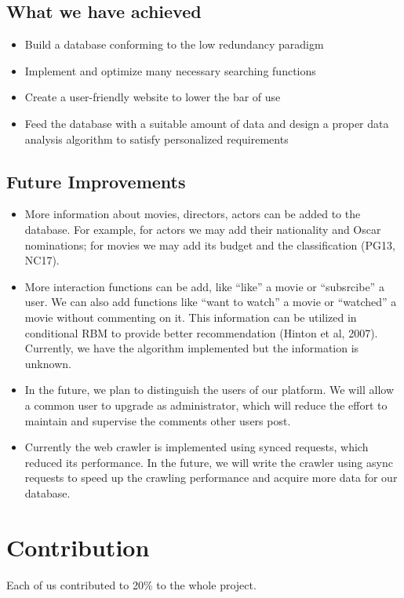 \begin{CJK*}{UTF8}{gbsn}
\subsection{What we have achieved}
\begin{itemize}
\item Build a database conforming to the low redundancy paradigm
\item Implement and optimize many necessary  searching functions
\item Create a user-friendly website to lower the bar of use
\item Feed the database with a suitable amount of data and design a proper data analysis algorithm to satisfy personalized requirements
\end{itemize}
\subsection{Future Improvements}
\begin{itemize}
\item More information about movies, directors, actors can be added to the database. For example, for actors we may add their nationality and Oscar nominations; for movies we may add its budget and the classification (PG13, NC17).
\item More interaction functions can be add, like ``like'' a movie or ``subsrcibe'' a user. We can also add functions like ``want to watch'' a movie or ``watched'' a movie without commenting on it. This information can be utilized in conditional RBM to provide better recommendation (Hinton et al, 2007). Currently, we have the algorithm implemented but the information is unknown. 
\item In the future, we plan to distinguish the users of our platform. We will allow a common user to upgrade as administrator, which will reduce the effort to maintain and supervise the comments other users post.
\item Currently the web crawler is implemented using synced requests, which reduced its performance. In the future, we will write the crawler using async requests to speed up the crawling performance and acquire more data for our database.
\end{itemize}

\section{Contribution}
Each of us contributed to 20\% to the whole project.
\newpage

\end{CJK*}
